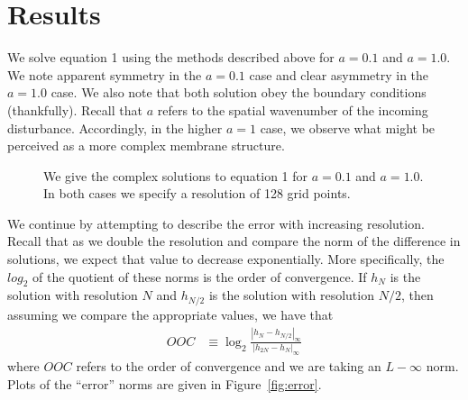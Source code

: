 \documentclass[10pt]{article}
\begin{document}
\section*{Results}
We solve equation 1 using the methods described above for $a = 0.1$ and $a = 1.0$.
We note apparent symmetry in the $a = 0.1$ case and clear asymmetry in the $a = 1.0$ case. 
We also note that both solution obey the boundary conditions (thankfully).
Recall that $a$ refers to the spatial wavenumber of the incoming disturbance.
Accordingly, in the higher $a = 1$ case, we observe what might be perceived as a more complex membrane structure.

\begin{figure}[H]
    \centering
    \vspace{0.3cm}
    \caption{We give the complex solutions to equation 1 for $a = 0.1$ and $a = 1.0$. In both cases we specify a resolution of 128 grid points.}
    \label{solns1}
\end{figure}
\clearpage
We continue by attempting to describe the error with increasing resolution. Recall that as we double the resolution and compare the norm of the difference in solutions, we expect that value to decrease exponentially.
More specifically, the $log_2$ of the quotient of these norms is the order of convergence. 
If $h_{N}$ is the solution with resolution $N$ and $h_{N/2}$ is the solution with resolution $N/2$, then assuming we compare the appropriate values, we have that
\begin{align}
    OOC &\equiv \log_2 \frac{|h_{N} - h_{N/2}|_{\infty}}{|h_{2N} - h_{N}|_{\infty}}  
\end{align}
where $OOC$ refers to the order of convergence and we are taking an $L-\infty$ norm.
Plots of the ``error'' norms are given in Figure~\ref{fig:error}.
\end{document}
